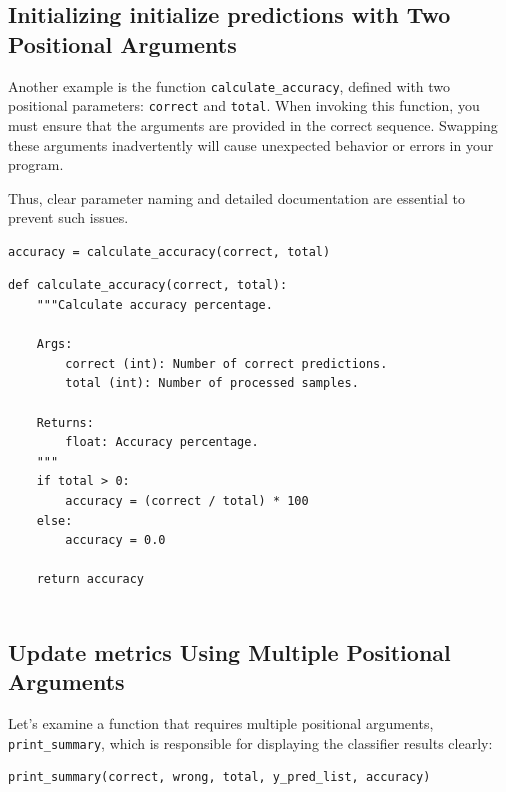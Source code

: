 \subsection{Initializing initialize predictions with Two Positional Arguments}

Another example is the function \texttt{calculate\_accuracy}, defined with two positional parameters: \texttt{correct} and \texttt{total}.
When invoking this function, you must ensure that the arguments are provided in the correct sequence. Swapping these arguments inadvertently will cause unexpected behavior or errors in your program.

Thus, clear parameter naming and detailed documentation are essential to prevent such issues.
\begin{verbatim}
accuracy = calculate_accuracy(correct, total)

\end{verbatim}



\begin{verbatim}
def calculate_accuracy(correct, total):
    """Calculate accuracy percentage.

    Args:
        correct (int): Number of correct predictions.
        total (int): Number of processed samples.

    Returns:
        float: Accuracy percentage.
    """
    if total > 0:
        accuracy = (correct / total) * 100
    else:
        accuracy = 0.0

    return accuracy
    
\end{verbatim}






\subsection{ Update metrics Using Multiple Positional Arguments}

Let's examine a function that requires multiple positional arguments, \texttt{print\_summary}, which is responsible for displaying the classifier results clearly:


\begin{verbatim}
print_summary(correct, wrong, total, y_pred_list, accuracy)
\end{verbatim}


